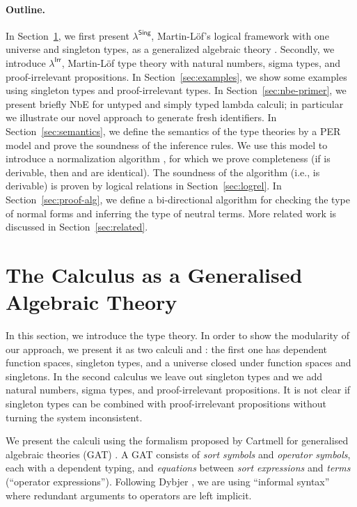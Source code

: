 \documentclass{LMCS}
\newcommand{\lambdaSing}{\texorpdfstring{\ensuremath{\lambda^{\mathsf{Sing}}}}{Singletons}}
\newcommand{\lambdaPI}{\texorpdfstring{\ensuremath{\lambda^{\mathsf{Irr}}}}{Proof-irrelevance}}
\newcommand{\LONGVERSION}[1]{}
\begin{document}
\paragraph{Outline.} 
In Section~\ref{sec:cwf-gat}, we first present \lambdaSing,
Martin-L\"of's logical framework with one universe and singleton
types, as a generalized algebraic theory \cite{cartmell}.  Secondly,
we introduce \lambdaPI, Martin-L\"of type theory with natural numbers,
sigma types, and proof-irrelevant propositions.  In
Section~\ref{sec:examples}, we show some examples using singleton types and
proof-irrelevant types.  In Section~\ref{sec:nbe-primer}, we present
briefly NbE for untyped and simply typed lambda calculi; in particular
we illustrate our novel approach to generate fresh identifiers.  In
Section~\ref{sec:semantics}, we define the semantics of the type
theories by a PER model and prove the soundness of the inference rules.
We use this model to introduce a normalization algorithm
, for which we prove completeness (if  is derivable,
then  and  are identical). 
The soundness of the algorithm (i.e.,  is derivable)
is proven by logical relations in Section~\ref{sec:logrel}.
In Section~\ref{sec:proof-alg}, we define a bi-directional algorithm for
checking the type of normal forms and inferring the type of neutral
terms.  More related work is discussed in Section~\ref{sec:related}.
\LONGVERSION{ The Haskell programs corresponding to the NbE, and
  type-checking algorithms are shown in the
  appendices~\ref{sec:nbealg} and~\ref{sec:alg}, respectively.  }

 \section{The Calculus as a Generalised Algebraic Theory}
\label{sec:cwf-gat}
 
\noindent In this section, we introduce the type theory.  In order to show the
modularity of our approach, we present it as two calculi 
and : the first one has dependent function spaces,
singleton types, and a universe closed under function spaces and
singletons. In the second calculus we leave out singleton types and we
add natural numbers, sigma types, and proof-irrelevant propositions.
It is not clear if singleton types can be combined with
proof-irrelevant propositions without turning the system inconsistent.


We present the calculi using the formalism proposed by Cartmell for
generalised algebraic theories (GAT) \cite{cartmell}.  A GAT consists
of \emph{sort symbols} and \emph{operator symbols}, each with
a dependent typing, and \emph{equations} between \emph{sort
  expressions} and \emph{terms} (``operator expressions'').
Following Dybjer \cite{dybjer:internalTypeTheory}, we are using
``informal syntax'' where redundant arguments to operators are left
implicit. 
\end{document}
